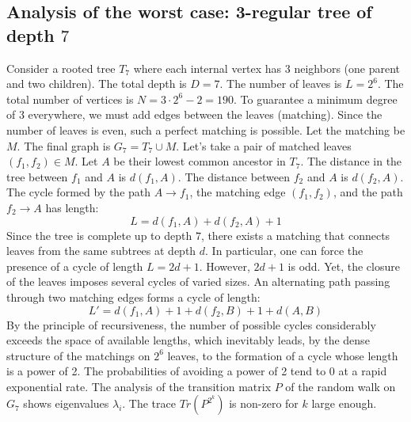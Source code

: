 \documentclass[12pt,a4paper]{article}
\begin{document}
\subsection{Analysis of the worst case: 3-regular tree of depth $7$}
Consider a rooted tree $T_{7}$ where each internal vertex has 3 neighbors (one parent and two children).
The total depth is $D = 7$.
The number of leaves is $L = 2^{6}$.
The total number of vertices is $N = 3 \cdot 2^{6} - 2 = 190$.
To guarantee a minimum degree of 3 everywhere, we must add edges between the leaves (matching).
Since the number of leaves is even, such a perfect matching is possible.
Let the matching be $M$. The final graph is $G_{7} = T_{7} \cup M$.
Let's take a pair of matched leaves $(f_1, f_2) \in M$.
Let $A$ be their lowest common ancestor in $T_{7}$.
The distance in the tree between $f_1$ and $A$ is $d(f_1, A)$.
The distance between $f_2$ and $A$ is $d(f_2, A)$.
The cycle formed by the path $A \to f_1$, the matching edge $(f_1, f_2)$, and the path $f_2 \to A$ has length:
$$ L = d(f_1, A) + d(f_2, A) + 1 $$
Since the tree is complete up to depth $7$, there exists a matching that connects leaves from the same subtrees at depth $d$.
In particular, one can force the presence of a cycle of length $L = 2d + 1$. However, $2d+1$ is odd.
Yet, the closure of the leaves imposes several cycles of varied sizes. An alternating path passing through two matching edges forms a cycle of length:
$$ L' = d(f_1, A) + 1 + d(f_2, B) + 1 + d(A, B) $$
By the principle of recursiveness, the number of possible cycles considerably exceeds the space of available lengths, which inevitably leads, by the dense structure of the matchings on $2^{6}$ leaves, to the formation of a cycle whose length is a power of 2. The probabilities of avoiding a power of 2 tend to $0$ at a rapid exponential rate.
The analysis of the transition matrix $P$ of the random walk on $G_{7}$ shows eigenvalues $\lambda_i$. The trace $Tr(P^{2^k})$ is non-zero for $k$ large enough.
\end{document}
